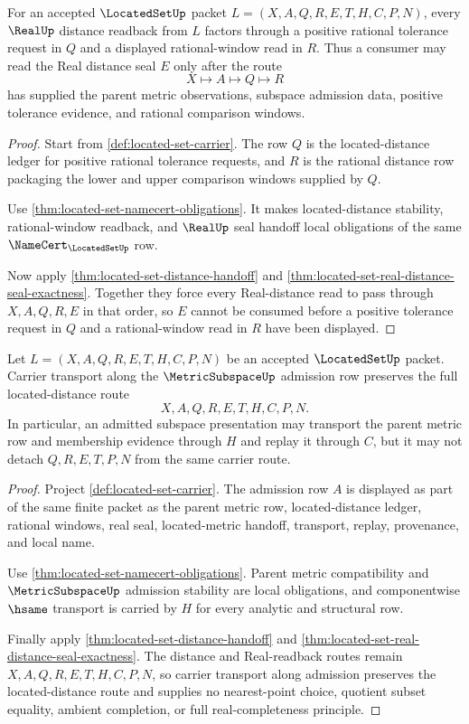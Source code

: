 \begin{theorem}
\label{thm:located-set-positive-tolerance-readback}
For an accepted $\LocatedSetUp$ packet $L=(X,A,Q,R,E,T,H,C,P,N)$, every $\RealUp$ distance readback from $L$ factors through a positive rational tolerance request in $Q$ and a displayed rational-window read in $R$. Thus a consumer may read the Real distance seal $E$ only after the route
$$
X\longmapsto A\longmapsto Q\longmapsto R
$$
has supplied the parent metric observations, subspace admission data, positive tolerance evidence, and rational comparison windows.
\end{theorem}
\begin{proof}
Start from \autoref{def:located-set-carrier}. The row $Q$ is the located-distance ledger for positive rational tolerance requests, and $R$ is the rational distance row packaging the lower and upper comparison windows supplied by $Q$.

Use \autoref{thm:located-set-namecert-obligations}. It makes located-distance stability, rational-window readback, and $\RealUp$ seal handoff local obligations of the same $\NameCert_{\LocatedSetUp}$ row.

Now apply \autoref{thm:located-set-distance-handoff} and \autoref{thm:located-set-real-distance-seal-exactness}. Together they force every Real-distance read to pass through $X,A,Q,R,E$ in that order, so $E$ cannot be consumed before a positive tolerance request in $Q$ and a rational-window read in $R$ have been displayed.
\end{proof}

\begin{theorem}
\label{thm:located-set-subspace-carrier-transport}
Let $L=(X,A,Q,R,E,T,H,C,P,N)$ be an accepted $\LocatedSetUp$ packet. Carrier transport along the $\MetricSubspaceUp$ admission row preserves the full located-distance route
$$
X,A,Q,R,E,T,H,C,P,N .
$$
In particular, an admitted subspace presentation may transport the parent metric row and membership evidence through $H$ and replay it through $C$, but it may not detach $Q,R,E,T,P,N$ from the same carrier route.
\end{theorem}
\begin{proof}
Project \autoref{def:located-set-carrier}. The admission row $A$ is displayed as part of the same finite packet as the parent metric row, located-distance ledger, rational windows, real seal, located-metric handoff, transport, replay, provenance, and local name.

Use \autoref{thm:located-set-namecert-obligations}. Parent metric compatibility and $\MetricSubspaceUp$ admission stability are local obligations, and componentwise $\hsame$ transport is carried by $H$ for every analytic and structural row.

Finally apply \autoref{thm:located-set-distance-handoff} and \autoref{thm:located-set-real-distance-seal-exactness}. The distance and Real-readback routes remain $X,A,Q,R,E,T,H,C,P,N$, so carrier transport along admission preserves the located-distance route and supplies no nearest-point choice, quotient subset equality, ambient completion, or full real-completeness principle.
\end{proof}

